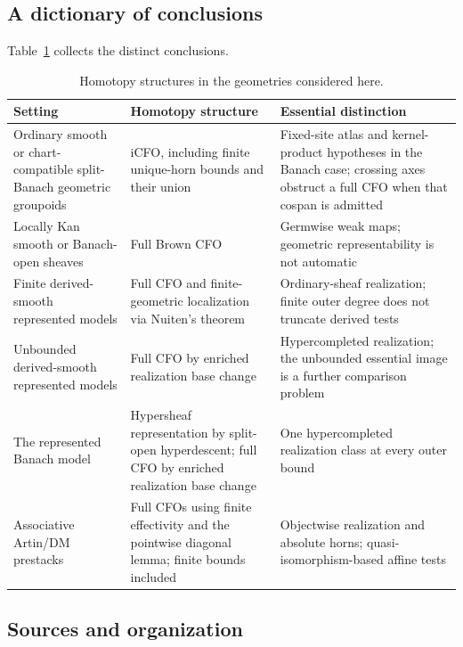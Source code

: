 \documentclass[12pt]{amsart}
\theoremstyle{definition}
\theoremstyle{remark}
\numberwithin{equation}{section}
\begin{document}
\subsection{A dictionary of conclusions}

Table~\ref{tab:geometry-dictionary} collects the distinct conclusions.

\begin{table}[tbp]
\caption{Homotopy structures in the geometries considered here.}
\label{tab:geometry-dictionary}
\centering
\begin{tabular}{@{}>{\raggedright\arraybackslash}p{}
                  >{\raggedright\arraybackslash}p{}
                  >{\raggedright\arraybackslash}p{}@{}}
\toprule
Setting & Homotopy structure & Essential distinction\\
\midrule
Ordinary smooth or chart-compatible split-Banach geometric groupoids
& iCFO, including finite unique-horn bounds and their union
& Fixed-site atlas and kernel-product hypotheses in the Banach case;
  crossing axes obstruct a full CFO when that cospan is admitted\\
\addlinespace
Locally Kan smooth or Banach-open sheaves
& Full Brown CFO
& Germwise weak maps; geometric representability is not automatic\\
\addlinespace
Finite derived-smooth represented models
& Full CFO and finite-geometric localization via Nuiten's theorem
& Ordinary-sheaf realization; finite outer degree does not truncate
  derived tests\\
\addlinespace
Unbounded derived-smooth represented models
& Full CFO by enriched realization base change
& Hypercompleted realization; the unbounded essential image is a
  further comparison problem\\
\addlinespace
The represented Banach model
& Hypersheaf representation by split-open hyperdescent;
  full CFO by enriched realization base change
& One hypercompleted realization class at every outer bound\\
\addlinespace
Associative Artin/DM prestacks
& Full CFOs using finite effectivity and the pointwise diagonal lemma;
  finite bounds included
& Objectwise realization and absolute horns;
  quasi-isomorphism-based affine tests\\
\bottomrule
\end{tabular}
\end{table}

\subsection{Sources and organization}
\end{document}
